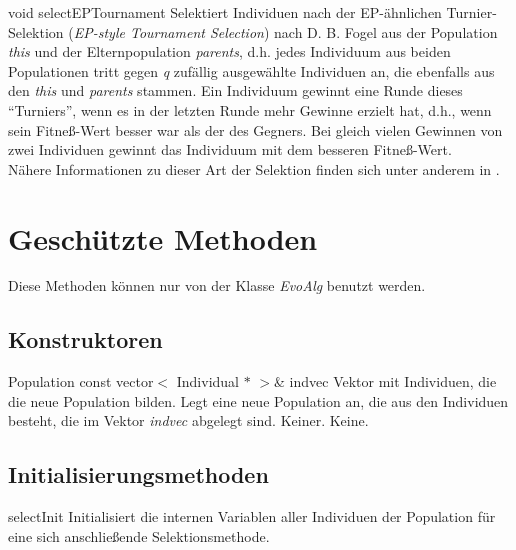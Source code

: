\documentclass{report}
\begin{document}
\setNormalInstance
\setCorrectWidthThree{8pt}
\printMethodWithParamsSaved
{void}
{}
{selectEPTournament}
{Selektiert Individuen nach der EP-\"ahnlichen Turnier-Selektion 
 ({\em EP-style Tournament Selection}) nach D. B. Fogel aus der 
 Population {\em this} und
 der Elternpopulation {\em parents}, d.h. jedes Individuum aus beiden
 Populationen tritt gegen {\em q} zuf\"allig ausgew\"ahlte Individuen
 an, die ebenfalls aus den {\em this} und {\em parents} stammen.
 Ein Individuum gewinnt eine Runde dieses ``Turniers'', wenn es in der
 letzten Runde mehr Gewinne erzielt hat, d.h., wenn sein Fitne{\ss}-Wert
 besser war als der des Gegners. Bei gleich vielen Gewinnen von zwei
 Individuen gewinnt das Individuum mit dem besseren Fitne{\ss}-Wert.\\
 N\"ahere Informationen zu dieser Art der Selektion finden sich unter
 anderem in \cite{Fogel}.}
{}
\setCorrectWidthThree{4pt}

\newpage
\section{Gesch\"utzte Methoden}
Diese Methoden k\"onnen nur von der Klasse {\em EvoAlg} benutzt 
werden.

\subsection{Konstruktoren}

\setNormalInstance
\printMethodWithOneParam
{}
{Population}
{const vector$<$ Individual $\ast$ $>$\&}
{indvec}
{Vektor mit Individuen, die die neue Population
                             bilden.}
{Legt eine neue Population an, die aus den Individuen
    besteht, die im Vektor {\em indvec} abgelegt sind.}
{Keiner.}
{Keine.}

\subsection{Initialisierungsmethoden}

\setNormalInstance
\printEmptyMethod
{selectInit}
{Initialisiert die internen Variablen aller Individuen der Population f\"ur 
    eine sich anschlie{\ss}ende Selektionsmethode.}
\end{document}

